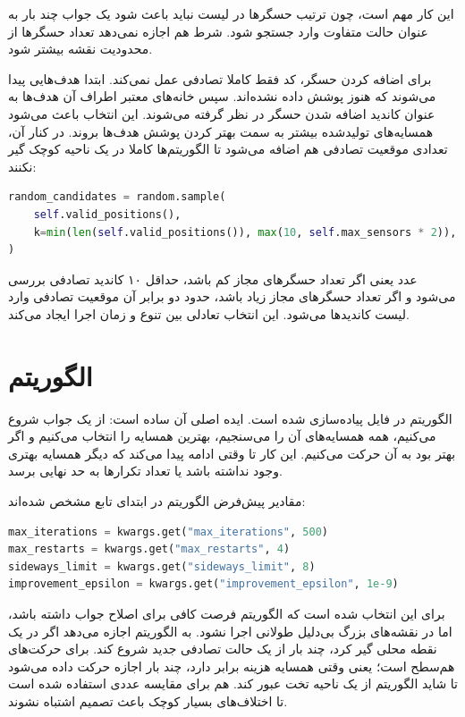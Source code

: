 \documentclass[10.5pt]{exam}
\begin{document}
این کار مهم است، چون ترتیب حسگرها در لیست نباید باعث شود یک جواب چند بار به عنوان حالت متفاوت وارد جستجو شود. شرط
هم اجازه نمی‌دهد تعداد حسگرها از محدودیت نقشه بیشتر شود.

برای اضافه کردن حسگر، کد فقط کاملا تصادفی عمل نمی‌کند. ابتدا هدف‌هایی پیدا می‌شوند که هنوز پوشش داده نشده‌اند. سپس خانه‌های معتبر اطراف آن هدف‌ها به عنوان کاندید اضافه شدن حسگر در نظر گرفته می‌شوند. این انتخاب باعث می‌شود همسایه‌های تولیدشده بیشتر به سمت بهتر کردن پوشش هدف‌ها بروند. در کنار آن، تعدادی موقعیت تصادفی هم اضافه می‌شود تا الگوریتم‌ها کاملا در یک ناحیه کوچک گیر نکنند:

\begin{latin}
\begin{lstlisting}[language=Python]
random_candidates = random.sample(
    self.valid_positions(),
    k=min(len(self.valid_positions()), max(10, self.max_sensors * 2)),
)
\end{lstlisting}
\end{latin}

عدد
یعنی اگر تعداد حسگرهای مجاز کم باشد، حداقل ۱۰ کاندید تصادفی بررسی می‌شود و اگر تعداد حسگرهای مجاز زیاد باشد، حدود دو برابر آن موقعیت تصادفی وارد لیست کاندیدها می‌شود. این انتخاب تعادلی بین تنوع و زمان اجرا ایجاد می‌کند.

\section{الگوریتم }
الگوریتم
در فایل
پیاده‌سازی شده است. ایده اصلی آن ساده است: از یک جواب شروع می‌کنیم، همه همسایه‌های آن را می‌سنجیم، بهترین همسایه را انتخاب می‌کنیم و اگر بهتر بود به آن حرکت می‌کنیم. این کار تا وقتی ادامه پیدا می‌کند که دیگر همسایه بهتری وجود نداشته باشد یا تعداد تکرارها به حد نهایی برسد.

مقادیر پیش‌فرض الگوریتم در ابتدای تابع
مشخص شده‌اند:

\begin{latin}
\begin{lstlisting}[language=Python]
max_iterations = kwargs.get("max_iterations", 500)
max_restarts = kwargs.get("max_restarts", 4)
sideways_limit = kwargs.get("sideways_limit", 8)
improvement_epsilon = kwargs.get("improvement_epsilon", 1e-9)
\end{lstlisting}
\end{latin}

برای این انتخاب شده است که الگوریتم فرصت کافی برای اصلاح جواب داشته باشد، اما در نقشه‌های بزرگ بی‌دلیل طولانی اجرا نشود.
به الگوریتم اجازه می‌دهد اگر در یک نقطه محلی گیر کرد، چند بار از یک حالت تصادفی جدید شروع کند.
برای حرکت‌های هم‌سطح است؛ یعنی وقتی همسایه هزینه برابر دارد، چند بار اجازه حرکت داده می‌شود تا شاید الگوریتم از یک ناحیه تخت عبور کند.
هم برای مقایسه عددی استفاده شده است تا اختلاف‌های بسیار کوچک باعث تصمیم اشتباه نشوند.
\end{document}

